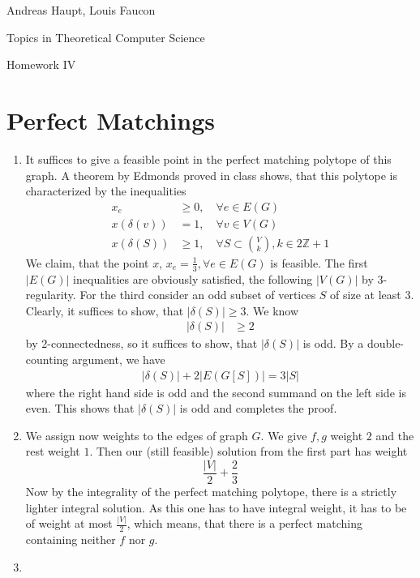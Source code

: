\documentclass{scrartcl}
\begin{document}
Andreas Haupt, Louis Faucon

Topics in Theoretical Computer Science 

Homework IV


\section{Perfect Matchings}\label{sec:perfectmatch}
\begin{enumerate}
\item
It suffices to give a feasible point in the perfect matching polytope of this graph. A theorem by Edmonds proved in class shows, that this polytope is characterized by the inequalities
\begin{align*}
x_e &\ge 0 , \quad \forall e \in E (G) \\
x(\delta (v)) &=1, \quad \forall v \in V(G) \\
x (\delta (S)) &\ge 1, \quad \forall S \subset \binom{V}{k}, k \in 2\mathbb{Z}+1
\end{align*}
We claim, that the point $x$, $x_e = \frac{1}{3}, \forall e \in E(G)$ is feasible. The first $\lvert E(G)\rvert$ inequalities are obviously satisfied, the following $\lvert V(G)\rvert$ by $3$-regularity. For the third consider an odd subset of vertices $S$ of size at least $3$. Clearly, it suffices to show, that $\lvert \delta (S) \rvert \ge 3$. We know
\begin{align*}
\lvert\delta (S)\rvert &\ge 2
\end{align*}
by $2$-connectedness, so it suffices to show, that $\lvert \delta (S) \rvert$ is odd. By a double-counting argument, we have
\begin{align*}
\lvert \delta (S) \rvert + 2\lvert E(G[S])\rvert = 3 \lvert S \rvert
\end{align*}
where the right hand side is odd and the second summand on the left side is even. This shows that $\lvert \delta (S) \rvert$ is odd and completes the proof.
\item
We assign now weights to the edges of graph $G$. We give $f,g$ weight $2$ and the rest weight $1$. Then our (still feasible) solution from the first part has weight
\[
\frac{\lvert V\rvert}{2} + \frac{2}{3}
\]
Now by the integrality of the perfect matching polytope, there is a strictly lighter integral solution. As this one has to have integral weight, it has to be of weight at most $\frac{\lvert V \rvert}{2}$, which means, that there is a perfect matching containing neither $f$ nor $g$.
\item \label{enum:bridge}

\end{enumerate}
\end{document}
